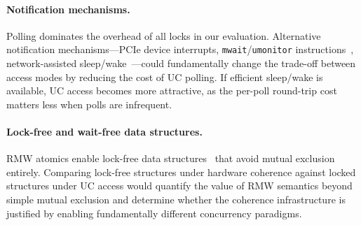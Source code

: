 \paragraph{Notification mechanisms.}
Polling dominates the overhead of all locks in our evaluation.
Alternative notification mechanisms---PCIe device interrupts, \texttt{mwait}/\texttt{umonitor} instructions~\cite{maHydraRPCRPCCXL}, network-assisted sleep/wake~\cite{hongDawnDisaggregationCoherence2025}---could fundamentally change the trade-off between access modes by reducing the cost of UC polling.
If efficient sleep/wake is available, UC access becomes more attractive, as the per-poll round-trip cost matters less when polls are infrequent.

\paragraph{Lock-free and wait-free data structures.}
RMW atomics enable lock-free data structures~\cite{herlihyWaitfreeSynchronization1991} that avoid mutual exclusion entirely.
Comparing lock-free structures under hardware coherence against locked structures under UC access would quantify the value of RMW semantics beyond simple mutual exclusion and determine whether the coherence infrastructure is justified by enabling fundamentally different concurrency paradigms.
